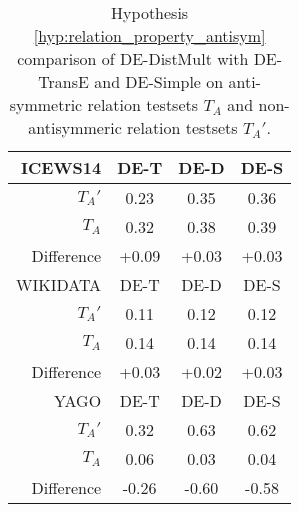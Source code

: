 \begin{table}[htb]
\centering
\begin{minipage}{\columnwidthcaption}
\centering
\caption{Hypothesis \autoref{hyp:relation_property_antisym} comparison of DE-DistMult with DE-TransE and DE-Simple on anti-symmetric relation testsets $T_A$ and non-antisymmeric relation testsets $T_A'$.}
\vspace{-3mm}

\begin{tabular}{r|ccc}\hline
ICEWS14 & DE-T & DE-D & DE-S \\ \hline
$T_A'$ & 0.23 & 0.35 & 0.36 \\
$T_A$ & 0.32 & 0.38 & 0.39 \\ \hline
Difference & +0.09 & +0.03 & +0.03 \\ \hline\hline
WIKIDATA & DE-T & DE-D & DE-S \\ \hline
$T_A'$ & 0.11 & 0.12 & 0.12 \\
$T_A$ & 0.14 & 0.14 & 0.14 \\ \hline
Difference & +0.03 & +0.02 & +0.03 \\ \hline\hline
YAGO & DE-T & DE-D & DE-S \\ \hline
$T_A'$ & 0.32 & 0.63 & 0.62 \\
$T_A$ & 0.06 & 0.03 & 0.04 \\ \hline
Difference & -0.26 & -0.60 & -0.58 \\ \hline
\end{tabular}

\label{tab:hypothesis_3_b_comparison}
\end{minipage}
\end{table}


